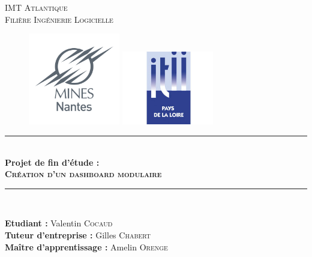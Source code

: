\documentclass[twoside, 12pt]{report}
\newcommand{\HRule}{\rule{\linewidth}{0.5mm}}
\begin{document}
\begin{titlepage}
  \begin{sffamily}
		\begin{center}
			\textsc{\LARGE IMT Atlantique\\Filière Ingénierie Logicielle}\\[2cm]
			\begin{figure}[h]
				\begin{minipage}{0.5\textwidth}
					\centering
					\includegraphics[width=4cm]{img/minesNantes.png}
				\end{minipage}%
				\begin{minipage}{0.5\textwidth}
					\centering
					\includegraphics[width=4cm]{img/itii.jpg}
				\end{minipage}
			\end{figure}

			\vfill
			\HRule \\[0.4cm]
				{\huge \bfseries Projet de fin d'étude :\\\textsc{Création d'un dashboard modulaire}\\[0.4cm] }
			\HRule \\[2cm]

			\vfill
			\begin{minipage}{0.8\textwidth}
				\begin{center} \large
					{\textbf{Etudiant :}} Valentin \textsc{Cocaud}\\
					{\textbf{Tuteur d'entreprise :}} Gilles \textsc{Chabert}\\
					{\textbf{Maître d'apprentissage :}} Amelin \textsc{Orenge}\\
				\end{center}
			\end{minipage}


\end{center}
\end{sffamily}
\end{titlepage}
\end{document}
